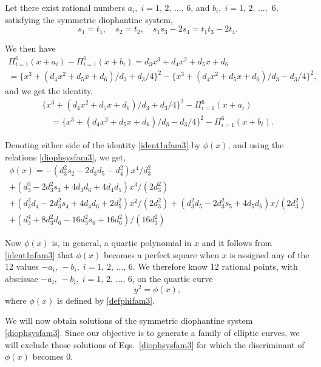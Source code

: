 \documentclass[11pt, leqno]{article}
\begin{document}
Let  there exist rational numbers  $a_i,\;i=1,\,2,\,\ldots,\,6$, and $b_i,\;i=1,\,2,\,\ldots,$ $ 6$, satisfying the symmetric diophantine system,
\begin{equation}
s_1=t_1, \quad s_2=t_2, \quad s_1s_3-2s_4=t_1t_3-2t_4. \label{diophsysfam3}
\end{equation}

We then have
\begin{multline}
\Pi_{i=1}^6(x+a_i)-\Pi_{i=1}^6(x+b_i)=d_3x^3+d_4x^2+d_5x+d_6\\
=\{x^3+(d_4x^2+d_5x+d_6)/d_3+d_3/4\}^2-\{x^3+(d_4x^2+d_5x+d_6)/d_3-d_3/4\}^2,\label{ident1fam3}
\end{multline}
and we get the identity,
\begin{multline}
\{x^3+(d_4x^2+d_5x+d_6)/d_3+d_3/4\}^2-\Pi_{i=1}^6(x+a_i)\\
\quad =\{x^3+(d_4x^2+d_5x+d_6)/d_3-d_3/4\}^2-\Pi_{i=1}^6(x+b_i).
\label{ident1afam3}
\end{multline}

Denoting either side of the identity \eqref{ident1afam3} by $\phi(x)$, and using the relations \eqref{diophsysfam3}, we get,
\begin{multline}
\phi(x)=-(d_3^2s_2-2d_3d_5-d_4^2)x^4/d_3^2\\
+(d_3^3-2d_3^2s_3+4d_3d_6+4d_4d_5)x^3/(2d_3^2)\\
+(d_3^2d_4-2d_3^2s_4+4d_4d_6+2d_5^2)x^2/(2d_3^2)+(d_3^2d_5-2d_3^2s_5+4d_5d_6)x/(2d_3^2)\\
+(d_3^4+8d_3^2d_6-16d_3^2s_6+16d_6^2)/(16d_3^2) \quad \quad \quad \label{defphifam3}
\end{multline}

Now $\phi(x)$ is, in general, a quartic polynomial in $x$ and it follows from \eqref{ident1afam3} that $\phi(x)$ becomes a perfect square when $x$ is assigned any of the 12 values $-a_i, \, -b_i, \;i=1,\,2,\,\ldots,\,6$. We therefore know  12 rational points, with abscissae $-a_i,\,-b_i,\;i=1,\,2,\,\ldots,\,6$, on the quartic curve
\begin{equation}
y^2=\phi(x), \label{ecfam3}
\end{equation}
where $\phi(x)$ is defined by \eqref{defphifam3}.

We will now obtain solutions of the symmetric diophantine system \eqref{diophsysfam3}. Since our objective is to generate a family of elliptic curves, we will exclude those  solutions of Eqs.~\eqref{diophsysfam3} for which  the discriminant of $\phi(x)$ becomes 0. 
\end{document}
